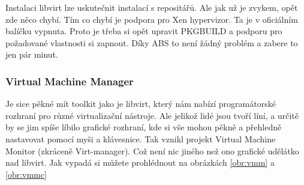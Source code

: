 Instalaci libvirt lze uskutečnit instalací s repositářů. Ale jak už je zvykem, opět zde něco chybí. Tím co chybí je podpora pro Xen hypervizor. Ta je v oficiálním balíčku vypnuta. Proto je třeba si opět upravit PKGBUILD a podporu pro požadované vlastnosti si zapnout. Díky ABS to není žádný problém a zabere to jen pár minut.
\subsubsection{Virtual Machine Manager}
Je sice pěkné mít toolkit jako je libvirt, který nám nabízí programátorské rozhraní pro různé virtualizační nástroje. Ale jelikož lidé jsou tvoří líní, a určitě by se jim spíše líbilo grafické rozhraní, kde si vše mohou pěkně a přehledně nastavovat pomocí myši a klávesnice. Tak vznikl projekt Virtual Machine Monitor (zkráceně Virt-manager). Což není nic jiného než ono grafické udělátko nad libvirt. Jak vypadá si můžete prohlédnout na obrázkách \ref{obr:vmm} a \ref{obr:vmmc}

